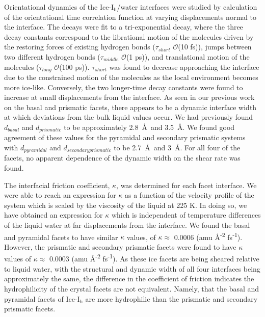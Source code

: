 \documentclass{pnastwo}
\begin{document}
\begin{article}
Orientational dynamics of the Ice-I$_\mathrm{h}$/water interfaces were studied
by calculation of the orientational time correlation function at varying
displacements normal to the interface. The decays were fit
to a tri-exponential decay, where the three decay constants correspond to
the librational motion of the molecules driven by the restoring forces of 
existing hydrogen bonds ($\tau_{short}$ $\mathcal{O}$(10 fs)), jumps between 
two different hydrogen bonds ($\tau_{middle}$ $\mathcal{O}$(1 ps)), and 
translational motion of the molecules ($\tau_{long}$ $\mathcal{O}$(100 ps)).
$\tau_{short}$ was found to decrease approaching the interface due to the 
constrained motion of the molecules as the local environment becomes more
ice-like. Conversely, the two longer-time decay constants were found to 
increase at small displacements from the interface. As seen in our previous 
work on the basal and prismatic facets, there appears to be a dynamic
interface width at which deviations from the bulk liquid values occur.
We had previously found $d_{basal}$ and $d_{prismatic}$ to be approximately 
2.8~\AA\ and 3.5~\AA. We found good agreement of these values for the 
pyramidal and secondary prismatic systems with $d_{pyramidal}$ and
$d_{secondary prismatic}$ to be 2.7~\AA\ and 3~\AA. For all four of the
facets, no apparent dependence of the dynamic width on the shear rate was 
found.
  
The interfacial friction coefficient, $\kappa$, was determined for each facet
interface. We were able to reach an expression for $\kappa$ as a function of
the velocity profile of the system which is scaled by the viscosity of the liquid
at 225 K. In doing so, we have obtained an expression for $\kappa$ which is 
independent of temperature differences of the liquid water at far displacements
from the interface. We found the basal and pyramidal facets to have
similar $\kappa$ values, of $\kappa \approx$ 0.0006 
(amu \AA\textsuperscript{-2} fs\textsuperscript{-1}). However, the
prismatic and secondary prismatic facets were found to have $\kappa$ values of 
$\kappa \approx$ 0.0003 (amu \AA\textsuperscript{-2} fs\textsuperscript{-1}).
As these ice facets are being sheared relative to liquid water, with the
structural and dynamic width of all four 
interfaces being approximately the same, the difference in the coefficient of 
friction indicates the hydrophilicity of the crystal facets are not 
equivalent. Namely, that the basal and pyramidal facets of Ice-I$_\mathrm{h}$
are more hydrophilic than the prismatic and secondary prismatic facets.



\end{article}
\end{document}
